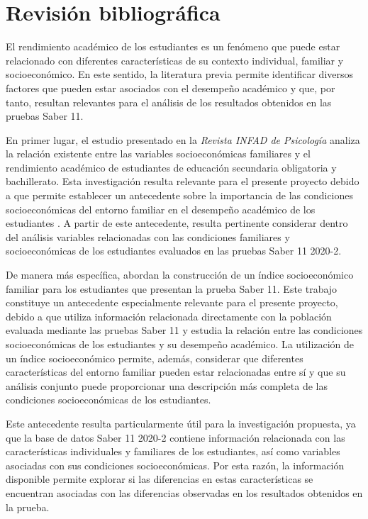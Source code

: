 \documentclass[12pt]{article}
\begin{document}
\section{Revisión bibliográfica}

El rendimiento académico de los estudiantes es un fenómeno que puede estar relacionado con diferentes características de su contexto individual, familiar y socioeconómico. En este sentido, la literatura previa permite identificar diversos factores que pueden estar asociados con el desempeño académico y que, por tanto, resultan relevantes para el análisis de los resultados obtenidos en las pruebas Saber 11.

En primer lugar, el estudio presentado en la \textit{Revista INFAD de Psicología} analiza la relación existente entre las variables socioeconómicas familiares y el rendimiento académico de estudiantes de educación secundaria obligatoria y bachillerato. Esta investigación resulta relevante para el presente proyecto debido a que permite establecer un antecedente sobre la importancia de las condiciones socioeconómicas del entorno familiar en el desempeño académico de los estudiantes \parencite{garciagil2021}. A partir de este antecedente, resulta pertinente considerar dentro del análisis variables relacionadas con las condiciones familiares y socioeconómicas de los estudiantes evaluados en las pruebas Saber 11 2020-2.

De manera más específica, \textcite{cruz2016} abordan la construcción de un índice socioeconómico familiar para los estudiantes que presentan la prueba Saber 11. Este trabajo constituye un antecedente especialmente relevante para el presente proyecto, debido a que utiliza información relacionada directamente con la población evaluada mediante las pruebas Saber 11 y estudia la relación entre las condiciones socioeconómicas de los estudiantes y su desempeño académico. La utilización de un índice socioeconómico permite, además, considerar que diferentes características del entorno familiar pueden estar relacionadas entre sí y que su análisis conjunto puede proporcionar una descripción más completa de las condiciones socioeconómicas de los estudiantes.

Este antecedente resulta particularmente útil para la investigación propuesta, ya que la base de datos Saber 11 2020-2 contiene información relacionada con las características individuales y familiares de los estudiantes, así como variables asociadas con sus condiciones socioeconómicas. Por esta razón, la información disponible permite explorar si las diferencias en estas características se encuentran asociadas con las diferencias observadas en los resultados obtenidos en la prueba.
\end{document}
